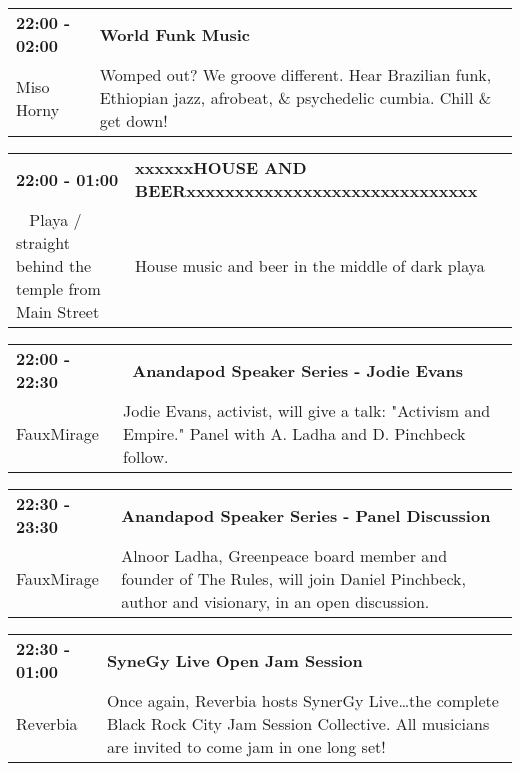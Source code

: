 \begin{tabular}{ p{1in} p{2.2in} }
    \textbf{22:00 - 02:00} & \textbf{World Funk Music} \\
    Miso Horny \newline  & Womped out? We groove different. Hear Brazilian funk, Ethiopian jazz, afrobeat, \& psychedelic cumbia. Chill \& get down! \\
    \hline 
\end{tabular}
    
\begin{tabular}{ p{1in} p{2.2in} }
    \textbf{22:00 - 01:00} & \textbf{xxxxxxHOUSE AND BEERxxxxxxxxxxxxxxxxxxxxxxxxxxxxxx} \\
    ~ \newline Playa / straight behind the temple from Main Street  & House music and beer in the middle of dark playa \\
    \hline 
\end{tabular}
    
\begin{tabular}{ p{1in} p{2.2in} }
    \textbf{22:00 - 22:30} & \textbf{~Anandapod Speaker Series - Jodie Evans} \\
    FauxMirage \newline  & Jodie Evans, activist, will give a talk: "Activism and Empire." Panel with A. Ladha and D. Pinchbeck follow. \\
    \hline 
\end{tabular}
    
\begin{tabular}{ p{1in} p{2.2in} }
    \textbf{22:30 - 23:30} & \textbf{Anandapod Speaker Series - Panel Discussion} \\
    FauxMirage \newline  & Alnoor Ladha, Greenpeace board member and founder of The Rules, will join Daniel Pinchbeck, author and visionary, in an open discussion. \\
    \hline 
\end{tabular}
    
\begin{tabular}{ p{1in} p{2.2in} }
    \textbf{22:30 - 01:00} & \textbf{SyneGy Live Open Jam Session} \\
    Reverbia \newline  & Once again, Reverbia hosts SynerGy Live\ldots the complete Black Rock City Jam Session Collective.  All musicians are invited to come jam in one long set! \\
    \hline 
\end{tabular}
    

